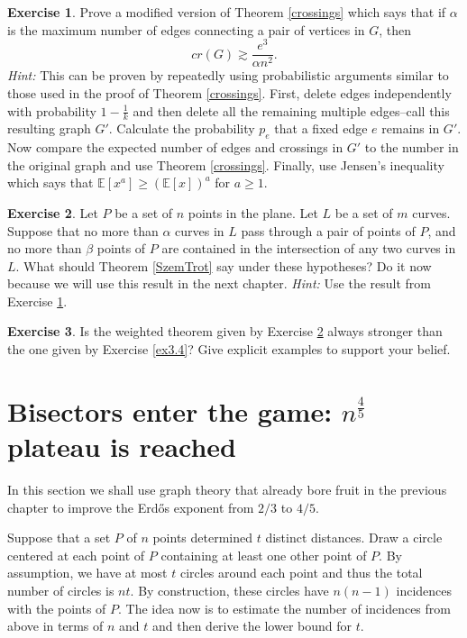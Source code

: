 \documentclass[]{amsart}
\numberwithin{equation}{section}
\theoremstyle{plain}
\theoremstyle{definition}
\newtheorem{exercise}{Exercise}[section]
\theoremstyle{remark}
\begin{document}
\begin{exercise} \label{ex3.5.1}
Prove a modified version of Theorem \ref{crossings} which says that if $\alpha$
is the maximum number of edges connecting a pair of vertices in $G$, then
\begin{equation}
cr(G) \gtrsim \frac{e^3}{\alpha n^2}.
\end{equation}
{\it Hint:}  This can be proven by repeatedly using probabilistic arguments similar to those used in the proof of Theorem \ref{crossings}.  First, delete edges independently with probability $1- \frac{1}{k}$ and then delete all the remaining multiple edges--call this resulting graph $G'$.  Calculate the probability $p_e$ that a fixed edge $e$ remains in $G'$.  Now compare the expected number of edges and crossings in $G'$ to the number in the original graph and use Theorem \ref{crossings}.  Finally, use Jensen's inequality which says that $\mathbb{E}[x^a] \geq (\mathbb{E}[x])^a$ for $a \geq 1$.
\end{exercise}


\begin{exercise} \label{ex3.5}
Let $P$ be a set of $n$ points in the plane. Let
$L$ be a set of $m$ curves. Suppose that no more than $\alpha$ curves
in $L$ pass through a pair of points of $P$, and no more than $\beta$ points
of $P$ are contained in the intersection of any two curves in $L$. What should
Theorem \ref{SzemTrot} say under these hypotheses? Do it now because we will use
this result in the next chapter.
{\it Hint:}  Use the result from Exercise \ref{ex3.5.1}.
\end{exercise}


\begin{exercise} \label{ex3.6}
Is the weighted theorem given by Exercise \ref{ex3.5} always
stronger than the one given by Exercise \ref{ex3.4}? Give explicit examples to
support your belief. \end{exercise}

\section{Bisectors enter the game: $n^{\frac{4}{5}}$
plateau is reached}


In this section we shall use graph theory that already bore fruit in
the previous
chapter to improve the Erd\H{o}s exponent from $2/3$ to $4/5$.

Suppose that a set $P$ of $n$ points determined $t$ distinct distances. Draw
a circle centered at each point of $P$ containing at least one other
point of $P$.
By assumption, we have at most $t$ circles around each point and thus the total
number of circles is $nt$. By construction, these circles have
$n(n-1)$ incidences
with the points of $P$. The idea now is to estimate the number of incidences
from above in terms of $n$ and $t$ and then derive the lower bound for $t$.
\end{document}

